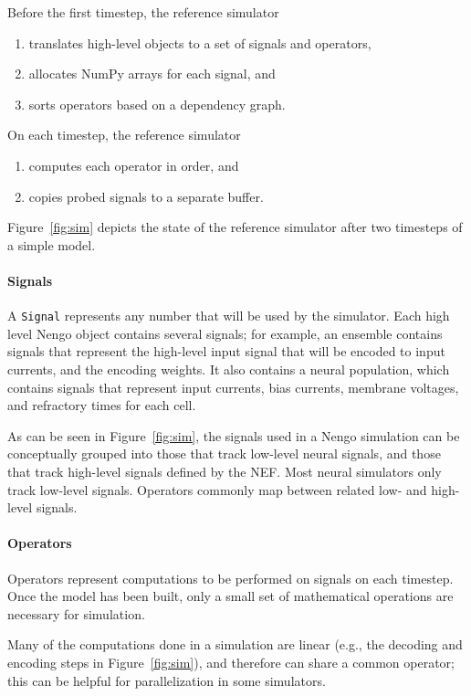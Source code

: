 \documentclass{frontiersSCNS}
\begin{document}
Before the first timestep, the reference simulator
\begin{enumerate}
  \item translates high-level objects to
    a set of signals and operators,
  \item allocates NumPy arrays for each signal, and
  \item sorts operators based on a dependency graph.
\end{enumerate}
On each timestep, the reference simulator
\begin{enumerate}
  \item computes each operator in order, and
  \item copies probed signals to a separate buffer.
\end{enumerate}
Figure~\ref{fig:sim} depicts
the state of the reference simulator
after two timesteps of a simple model.

\paragraph{Signals}

A \texttt{Signal} represents any number that
will be used by the simulator.
Each high level Nengo object contains
several signals;
for example, an ensemble contains signals
that represent the high-level input
signal that will be encoded
to input currents,
and the encoding weights.
It also contains a neural population,
which contains signals that represent
input currents, bias currents,
membrane voltages, and refractory times for each cell.

As can be seen in Figure~\ref{fig:sim},
the signals used in a Nengo simulation
can be conceptually grouped into
those that track low-level neural signals,
and those that track high-level signals
defined by the NEF.
Most neural simulators only track
low-level signals.
Operators commonly map
between related low- and high-level signals.

\paragraph{Operators}

Operators represent computations
to be performed on signals on each timestep.
Once the model has been built,
only a small set of mathematical
operations are necessary for simulation.

Many of the computations
done in a simulation
are linear (e.g.,
the decoding and encoding steps
in Figure~\ref{fig:sim}),
and therefore can share a common operator;
this can be helpful for parallelization
in some simulators.
\end{document}

